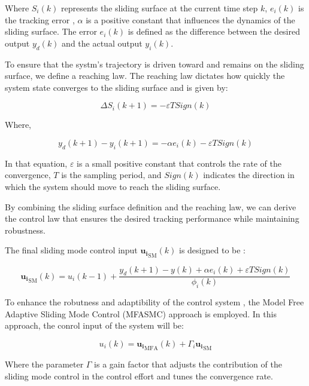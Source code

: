 \documentclass[journal,onecolumn]{IEEEtran}
\begin{document}
Where \(S_i(k)\) represents the sliding surface at the current time step \(k\), \(e_i(k)\) is the tracking error , \(\alpha\) is a positive constant that influences the dynamics of the sliding surface. The error \(e_i(k)\) is defined as the difference between the desired output \(y_d(k)\) and the actual output \(y_i(k)\).

To ensure that the systm's trajectory is driven toward and remains on the sliding surface, we define a reaching law. The reaching law dictates how quickly the system state converges to the sliding surface and is given by:

\begin{equation}
    \label{model eq:reaching_law}
    \Delta S_i(k+1) = - \varepsilon T Sign(k) 
\end{equation}

Where,

\begin{equation}
    \label{model 13}
    y_d(k+1) - y_i(k+1) = - \alpha e_i(k) - \varepsilon T Sign(k) 
\end{equation}


In that equation, \(\varepsilon\) is a small positive constant that controls the rate of the convergence, \(T\) is the sampling period, and \(Sign(k)\) indicates the direction in which the system should move to reach the sliding surface.

By combining the sliding surface definition and the reaching law, we can derive the control law that ensures the desired tracking performance while maintaining robustness.

The final sliding mode control input \(\mathbf{u_i}_{\text{SM}}(k)\) is designed to be :

\begin{equation}
    \label{model eq:smc}
    \mathbf{u_i}_{\text{SM}}(k) = u_i(k-1) + \frac{y_d(k+1)-y(k) + \alpha e_i(k) + \varepsilon T Sign(k)}{\phi_i(k)}
\end{equation}

To enhance the robutness and adaptibility of the control system , the Model Free Adaptive Sliding Mode Control (MFASMC) approach is employed. In this approach, the conrol input of the system will be:

\begin{equation}
    \label{model eq:mfasmc}
    u_i(k) = \mathbf{u_i}_{\text{MFA}}(k) + \Gamma_i \mathbf{u_i}_{\text{SM}}
\end{equation}

Where the parameter \(\Gamma\) is a gain factor that adjusts the contribution of the sliding mode control in the control effort and tunes the convergence rate.
\end{document}
